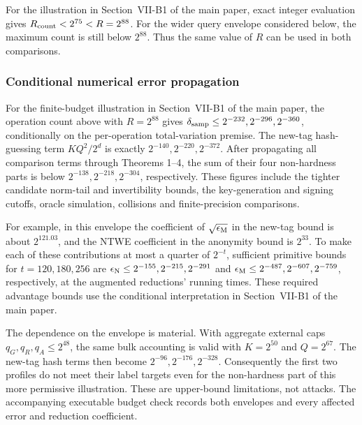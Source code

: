 \documentclass[lettersize,journal]{IEEEtran}
\begin{document}
For the illustration in Section~VII-B1 of the main paper, exact integer evaluation gives
$R_{\rm count}<2^{75}<R=2^{88}$. For the wider query envelope considered below,
the maximum count is still below $2^{88}$. Thus the same value of $R$ can
be used in both comparisons. 

\subsubsection{Conditional numerical error propagation}
For the finite-budget illustration in Section~VII-B1 of the main paper, the operation count
above with $R=2^{88}$ gives
$\delta_{\rm samp}\le2^{-232},2^{-296},2^{-360}$, conditionally on the
per-operation total-variation premise. The new-tag hash-guessing term
$KQ^2/2^d$ is exactly $2^{-140},2^{-220},2^{-372}$. After propagating all
comparison terms through Theorems 1--4, the sum of their four non-hardness
parts is below $2^{-138},2^{-218},2^{-304}$, respectively. These figures
include the tighter candidate norm-tail and invertibility bounds, the
key-generation and signing cutoffs, oracle simulation, collisions and
finite-precision comparisons.

For example, in this envelope the coefficient of $\sqrt{\epsilon_{\rm M}}$
in the new-tag bound is about $2^{121.03}$, and the NTWE coefficient in the
anonymity bound is $2^{33}$. To make each of these contributions at most a
quarter of $2^{-t}$, sufficient primitive bounds for $t=120,180,256$ are
$\epsilon_{\rm N}\le2^{-155},2^{-215},2^{-291}$ and
$\epsilon_{\rm M}\le2^{-487},2^{-607},2^{-759}$, respectively, at the
augmented reductions' running times. These required advantage bounds use the conditional interpretation in Section~VII-B1 of the main paper.

The dependence on the envelope is material. With aggregate external caps
$q_G,q_R,q_A\le2^{48}$, the same bulk accounting is valid with $K=2^{50}$
and $Q=2^{67}$. The new-tag hash terms then become
$2^{-96},2^{-176},2^{-328}$. Consequently the first two profiles do not
meet their label targets even for the non-hardness part of this more
permissive illustration. These are upper-bound limitations, not attacks.
The accompanying executable budget check records both envelopes and every
affected error and reduction coefficient.
	
\end{document}
